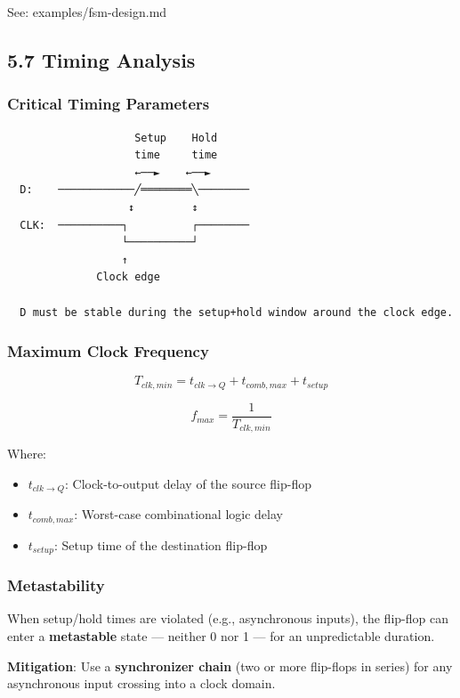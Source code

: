 \documentclass[11pt,a4paper]{book}
\begin{document}
See: examples/fsm-design.md

\medskip\noindent\hrulefill\medskip

\subsection{5.7 Timing Analysis}

\subsubsection{Critical Timing Parameters}

\begin{lstlisting}
                    Setup    Hold
                    time     time
                    ←──►    ←──►
  D:    ────────────╱════════╲────────
                   ↕         ↕
  CLK:  ──────────┐          ┌────────
                  └──────────┘
                  ↑
              Clock edge
              
  D must be stable during the setup+hold window around the clock edge.
\end{lstlisting}

\subsubsection{Maximum Clock Frequency}

\[T_{clk,min} = t_{clk \to Q} + t_{comb,max} + t_{setup}\]

\[f_{max} = \frac{1}{T_{clk,min}}\]

Where:
\begin{itemize}
\item $t_{clk \to Q}$: Clock-to-output delay of the source flip-flop
\item $t_{comb,max}$: Worst-case combinational logic delay
\item $t_{setup}$: Setup time of the destination flip-flop
\end{itemize}

\subsubsection{Metastability}

When setup/hold times are violated (e.g., asynchronous inputs), the flip-flop can enter a \textbf{metastable} state — neither 0 nor 1 — for an unpredictable duration.

\textbf{Mitigation}: Use a \textbf{synchronizer chain} (two or more flip-flops in series) for any asynchronous input crossing into a clock domain.
\end{document}
